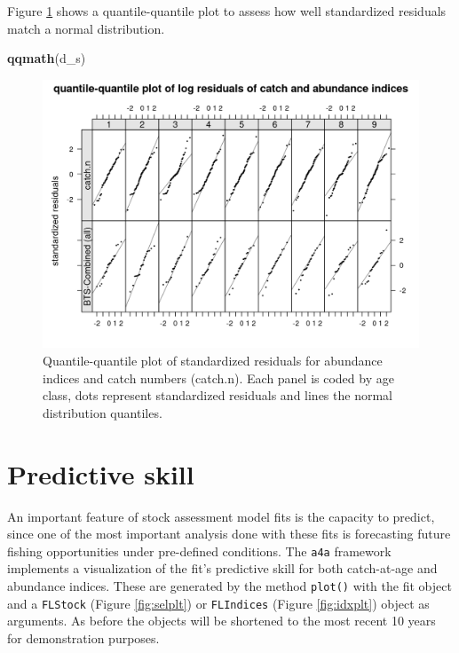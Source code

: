 \documentclass[
]{book}
\newenvironment{Shaded}{\begin{snugshade}}{\end{snugshade}}
\newcommand{\FunctionTok}[1]{\textcolor[rgb]{0.13,0.29,0.53}{\textbf{#1}}}
\newcommand{\NormalTok}[1]{#1}
\begin{document}
Figure \ref{fig:qq} shows a quantile-quantile plot to assess how well standardized residuals match a normal distribution.

\begin{Shaded}
\begin{Highlighting}[]
\FunctionTok{qqmath}\NormalTok{(d\_s)}
\end{Highlighting}
\end{Shaded}

\begin{figure}
\centering
\includegraphics{_bookdown_files/_main_files/figure-html/qq-1.png}
\caption{\label{fig:qq}Quantile-quantile plot of standardized residuals for abundance indices and catch numbers (catch.n). Each panel is coded by age class, dots represent standardized residuals and lines the normal distribution quantiles.}
\end{figure}

\hypertarget{predictive-skill}{%
\section{Predictive skill}\label{predictive-skill}}

An important feature of stock assessment model fits is the capacity to predict, since one of the most important analysis done with these fits is forecasting future fishing opportunities under pre-defined conditions. The \texttt{a4a} framework implements a visualization of the fit's predictive skill for both catch-at-age and abundance indices. These are generated by the method \texttt{plot()} with the fit object and a \texttt{FLStock} (Figure \ref{fig:selplt}) or \texttt{FLIndices} (Figure \ref{fig:idxplt}) object as arguments. As before the objects will be shortened to the most recent 10 years for demonstration purposes.
\end{document}
